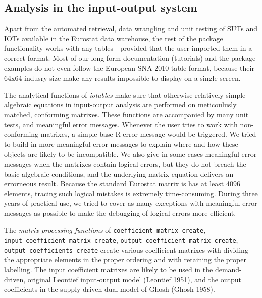 \documentclass[
]{article}
\begin{document}
\hypertarget{analysis-in-the-input-output-system}{%
\subsection{Analysis in the input-output
system}\label{analysis-in-the-input-output-system}}

Apart from the automated retrieval, data wrangling and unit testing of
SUTs and IOTs available in the Eurostat data warehouse, the rest of the
package functionality works with any tables---provided that the user
imported them in a correct format. Most of our long-form documentation
(tutorials) and the package examples do not even follow the European SNA
2010 table format, because their 64x64 indusry size make any results
impossible to display on a single screen.

The analytical functions of \emph{iotables} make sure that otherwise
relatively simple algebraic equations in input-output analysis are
performed on meticoulusly matched, conforming matrixes. These functions
are accompanied by many unit tests, and meaningful error messages.
Whenever the user tries to work with non-conforming matrixes, a simple
base R error message would be triggered. We tried to build in more
meaningful error messages to explain where and how these objects are
likely to be incompatible. We also give in some cases meaningful error
messages when the matrixes contain logical errors, but they do not
breach the basic algebraic conditions, and the underlying matrix
equation delivers an errorneous result. Because the standard Eurostat
matrix is has at least 4096 elements, tracing such logical mistakes is
extremely time-consuming. During three years of practical use, we tried
to cover as many exceptions with meaningful error messages as possible
to make the debugging of logical errors more efficient.

The \emph{matrix processing functions} of
\texttt{coefficient\_matrix\_create},
\texttt{input\_coefficient\_matrix\_create},
\texttt{output\_coefficient\_matrix\_create},
\texttt{output\_coefficients\_create} create various coefficient
matrixes with dividing the appropriate elements in the proper ordering
and with retaining the proper labelling. The input coefficient matrixes
are likely to be used in the demand-driven, original Leontief
input-output model (Leontief 1951), and the output coefficients in the
supply-driven dual model of Ghosh (Ghosh 1958).
\end{document}
